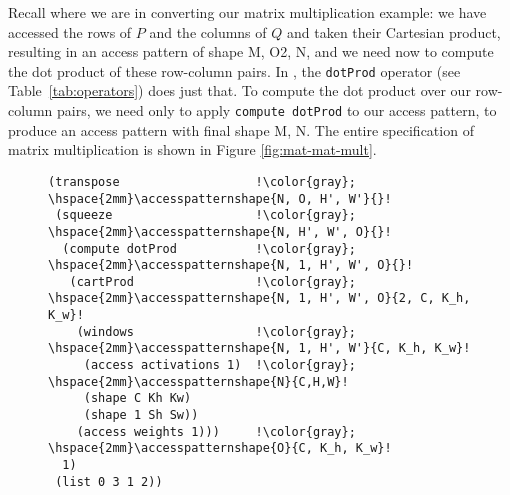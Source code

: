 Recall where we are
  in converting
  our matrix multiplication
  example:
  we have accessed the rows of $P$
  and the columns of $Q$
  and taken their Cartesian product,
  resulting in an access pattern
  of shape
  \accesspatternshape
  {M, O}{2, N},
  and we need now
  to compute the dot product
  of these row-column
  pairs.
In \g,
  the \texttt{dotProd}
  operator
  (see Table~\ref{tab:operators})
  does just that.
To compute the dot product
  over our row-column pairs,
  we need only to apply
  \texttt{compute dotProd}
  to our access pattern,
  to produce an access pattern
  with final shape
  \accesspatternshape
  {M, N}{}.
The entire \g
  specification
  of matrix multiplication
  is shown in Figure \ref{fig:mat-mat-mult}.
  
  
\begin{figure*}
\begin{minipage}{.54\textwidth}
\begin{subfigure}{\textwidth}
\begin{lstlisting}[basicstyle=\footnotesize,escapechar=!]
(transpose                   !\color{gray}; \hspace{2mm}\accesspatternshape{N, O, H', W'}{}!
 (squeeze                    !\color{gray}; \hspace{2mm}\accesspatternshape{N, H', W', O}{}!
  (compute dotProd           !\color{gray}; \hspace{2mm}\accesspatternshape{N, 1, H', W', O}{}!
   (cartProd                 !\color{gray}; \hspace{2mm}\accesspatternshape{N, 1, H', W', O}{2, C, K_h, K_w}!
    (windows                 !\color{gray}; \hspace{2mm}\accesspatternshape{N, 1, H', W'}{C, K_h, K_w}!
     (access activations 1)  !\color{gray}; \hspace{2mm}\accesspatternshape{N}{C,H,W}!
     (shape C Kh Kw)
     (shape 1 Sh Sw))
    (access weights 1)))     !\color{gray}; \hspace{2mm}\accesspatternshape{O}{C, K_h, K_w}!
  1)
 (list 0 3 1 2))
 
     \end{lstlisting}
       \vspace{-1.5em}
    \label{fig:conv2d}
\end{subfigure}
\end{minipage}
\begin{minipage}{.45\textwidth}


\end{minipage}
\end{figure*}
